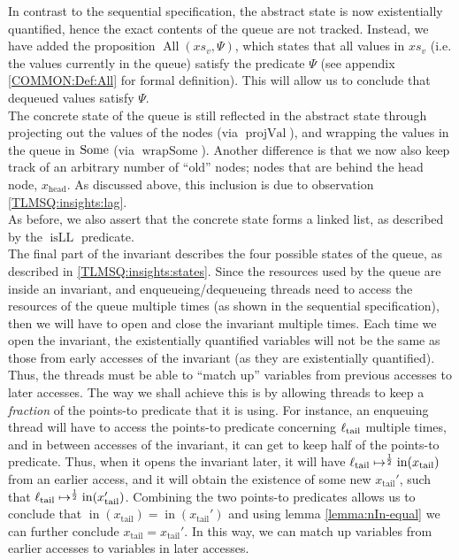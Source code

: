\documentclass[a4paper, 10pt]{report}
\theoremstyle{definition}
\newcommand{\isLL}{\operatorname{isLL}}
\newcommand{\AllP}{\operatorname{All}}
\newcommand{\projval}{\operatorname{projVal}}
\newcommand{\wrapsome}{\operatorname{wrapSome}}
\newcommand{\locN}[1]{\loc_{\mathrm{#1}}}
\newcommand{\loctail}{\locN{tail}}
\newcommand{\nIn}[1]{\operatorname{in}(#1)}
\newcommand{\node}{x}
\newcommand{\nodeN}[1]{\node_{\mathrm{#1}}}
\newcommand{\nodehead}{\nodeN{head}}
\newcommand{\nodetail}{\nodeN{tail}}
\newcommand{\absvalueList}{xs_v}
\begin{document}
In contrast to the sequential specification, the abstract state is now existentially quantified, hence the exact contents of the queue are not tracked. Instead, we have added the proposition $\AllP(\absvalueList, \Psi)$, which states that all values in $\absvalueList$ (i.e. the values currently in the queue) satisfy the predicate $\Psi$ (see appendix \ref{COMMON:Def:All} for formal definition). This will allow us to conclude that dequeued values satisfy $\Psi$.\\
The concrete state of the queue is still reflected in the abstract state through projecting out the values of the nodes (via $\projval$), and wrapping the values in the queue in $\operatorname{Some}$ (via $\wrapsome$). Another difference is that we now also keep track of an arbitrary number of ``old'' nodes; nodes that are behind the head node, $\nodehead$. As discussed above, this inclusion is due to observation \ref{TLMSQ:insights:lag}.\\
As before, we also assert that the concrete state forms a linked list, as described by the $\isLL$ predicate.\\
The final part of the invariant describes the four possible states of the queue, as described in \ref{TLMSQ:insights:states}. Since the resources used by the queue are inside an invariant, and enqueueing/dequeueing threads need to access the resources of the queue multiple times (as shown in the sequential specification), then we will have to open and close the invariant multiple times. Each time we open the invariant, the existentially quantified variables will not be the same as those from early accesses of the invariant (as they are existentially quantified). Thus, the threads must be able to ``match up'' variables from previous accesses to later accesses. The way we shall achieve this is by allowing threads to keep a \textit{fraction} of the points-to predicate that it is using. For instance, an enqueuing thread will have to access the points-to predicate concerning $\loctail$ multiple times, and in between accesses of the invariant, it can get to keep half of the points-to predicate. Thus, when it opens the invariant later, it will have $\loctail \mapsto^{\frac{1}{2}} \nIn{\nodetail}$ from an earlier access, and it will obtain the existence of some new $\nodetail'$, such that $\loctail \mapsto^{\frac{1}{2}} \nIn{\nodetail'}$. Combining the two points-to predicates allows us to conclude that $\nIn{\nodetail} = \nIn{\nodetail'}$ and using lemma \ref{lemma:nIn-equal} we can further conclude $\nodetail = \nodetail'$. In this way, we can match up variables from earlier accesses to variables in later accesses.\\
\end{document}
